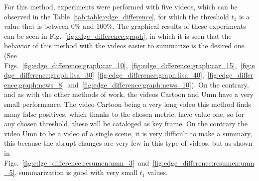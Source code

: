 \documentclass[journal]{IEEEtran}
\begin{document}
For this method, experiments were performed with five videos, which can be observed in the Table~\ref{tab:table:edge_difference}, for which the threshold $t_1$ is a value that is between  $0\%$ and $100\%$. The graphical results of these experiments can be seen in Fig.~\ref{fig:edge_difference:graph}, in which it is seen that the behavior of this method with the videos easier to summarize is the desired one (See Figs.~\ref{fig:edge_difference:graph:car_10},~\ref{fig:edge_difference:graph:car_15},~\ref{fig:edge_difference:graph:lisa_30}~\ref{fig:edge_difference:graph:lisa_40},~\ref{fig:edge_difference:graph:news_8}~and~\ref{fig:edge_difference:graph:news_10}). On the contrary, and as with the other methods of work, the videos Cartoon and Umn have a very small performance. The video Cartoon being a very long video this method finds many false positives, which thanks to the chosen metric, have value one, so for any chosen threshold, these will be cataloged as key frame. On the contrary the video Umn to be a video of a single scene, it is very difficult to make a summary, this because the abrupt changes are very few in this type of videos, but as shown in Figs.~\ref{fig:edge_difference:resumen:umn_3}~and~\ref{fig:edge_difference:resumen:umn_5}, summarization is good with very small $t_1$ values.
\end{document}
